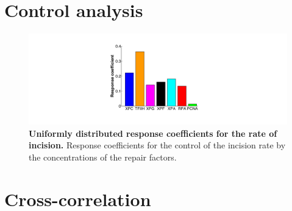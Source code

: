 \section{Control analysis}

\begin{figure}[h!]
	\begin{center}
		\includegraphics[width=1\textwidth]{Abbildungen/figure_A_4.pdf}
		\caption{\textbf{Uniformly distributed response coefficients for the rate of incision.} Response coefficients for the control of the incision rate by the concentrations of the repair factors. }
		\label{fig:cc_rateOfincision}
	\end{center}
\end{figure}


\newpage
\section{Cross-correlation}

